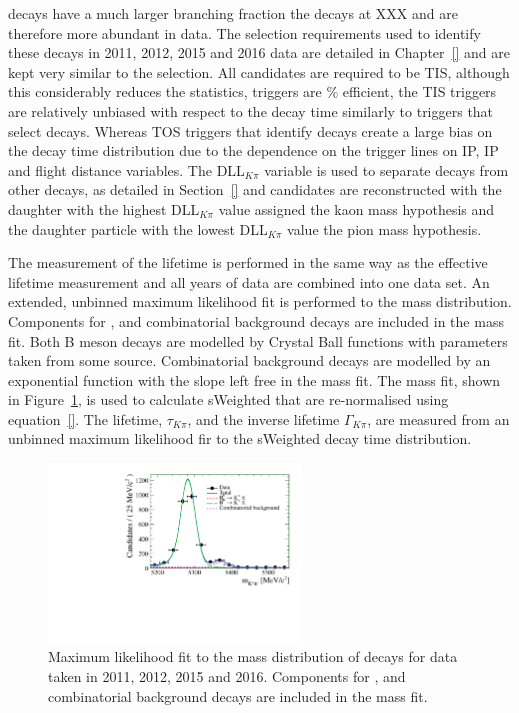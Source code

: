 \bdkpi decays have a much larger branching fraction the \bsmumu decays at XXX and are therefore more abundant in data. The selection requirements used to identify these decays in 2011, 2012, 2015 and 2016 data are detailed in Chapter~\ref{} and are kept very similar to the \bsmumu selection. All candidates are required to be TIS, although this considerably reduces the statistics, \bhh triggers are $\%$ efficient, the TIS triggers are relatively unbiased with respect to the decay time similarly to triggers that select \bsmumu decays. Whereas TOS triggers that identify \bhh decays create a large bias on the decay time distribution due to the dependence on the trigger lines on IP, IP \chisqd and flight distance variables. The DLL$_{K\pi}$ variable is used to separate \bdkpi decays from other \bhh decays, as detailed in Section~\ref{} and candidates are reconstructed with the daughter with the highest DLL$_{K\pi}$ value assigned the kaon mass hypothesis and the daughter particle with the lowest DLL$_{K\pi}$ value the pion mass hypothesis.

The measurement of the \bdki lifetime is performed in the same way as the \bsmumu effective lifetime measurement and all years of data are combined into one data set. An extended, unbinned maximum likelihood fit is performed to the \bdkpi mass distribution. Components for \bdkpi, \bskpi and combinatorial background decays are included in the mass fit. Both B meson decays are modelled by Crystal Ball functions with parameters taken from some source. Combinatorial background decays are modelled by an exponential function with the slope left free in the mass fit. The mass fit, shown in Figure~\ref{fig:bdkpimassfit}, is used to calculate sWeighted that are re-normalised using equation~\ref{}. The lifetime, $\tau_{K\pi}$, and the inverse lifetime $\Gamma_{K\pi}$, are measured from an unbinned maximum likelihood fir to the sWeighted decay time distribution. 

\begin{figure}[htbp]
\centering
  \includegraphics[width=0.6\textwidth]{./Figs/LifetimeSystematics/Bd2KPi_mass_fit.pdf}
\caption{Maximum likelihood fit to the mass distribution of \bdkpi decays for data taken in 2011, 2012, 2015 and 2016. Components for \bdkpi, \bskpi and combinatorial background decays are included in the mass fit. }
\label{fig:bdkpimassfit}
\end{figure}


